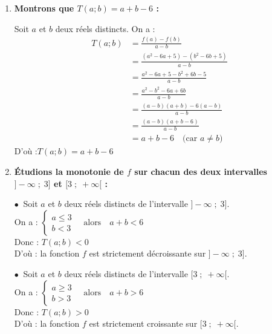\documentclass[10pt, a4paper]{article}
\begin{document}
\begin{Solution}[APPLICATION][9]
\begin{enumerate}[leftmargin=*,itemsep=0.5pt]
    \item \textbf{Montrons que $T(a;b) = a+b-6$ :}
    
    Soit $a$ et $b$ deux réels distincts.
    On a :
    \begin{align*}
        T(a;b) &= \frac{f(a) - f(b)}{a - b} \\
        &= \frac{(a^2 - 6a + 5) - (b^2 - 6b + 5)}{a - b} \\
        &= \frac{a^2 - 6a + 5 - b^2 + 6b - 5}{a - b} \\
        &= \frac{a^2 - b^2 - 6a + 6b}{a - b} \\
        &= \frac{(a-b)(a+b) - 6(a-b)}{a - b} \\
        &= \frac{(a-b)(a+b-6)}{a - b} \\
        &= a + b - 6 \quad \text{(car } a \neq b \text{)}
    \end{align*}
    D'où :\quad $T(a;b) = a+b-6$ 

    \item \textbf{Étudions la monotonie de $f$ sur chacun des deux intervalles $\big]-\infty \;;\; 3\big]$ et $\big[3 \;;\; +\infty\big[$ :}
    
    $\bullet~$ Soit $a$ et $b$ deux réels distincts de l'intervalle $\big]-\infty \;;\; 3\big]$.\\
    On a :
    $\begin{cases}
        a \leq 3 \\
        b < 3
    \end{cases} \quad \text{alors} \quad a + b < 6$ \\
    Donc : \quad $T(a;b) < 0$ \\
    D'où : la fonction $f$ est strictement décroissante sur $\big]-\infty \;;\; 3\big]$.

    $\bullet~$ Soit $a$ et $b$ deux réels distincts de l'intervalle $\big[3 \;;\; +\infty\big[$. \\
    On a :
    $\begin{cases}
        a \geq 3 \\
        b > 3
    \end{cases} \quad \text{alors} \quad a + b > 6$ \\
    Donc : \quad $T(a;b) > 0$ \\
    D'où : la fonction $f$ est strictement croissante sur $\big[3 \;;\; +\infty\big[$.


\end{enumerate}
\end{Solution}
\end{document}
